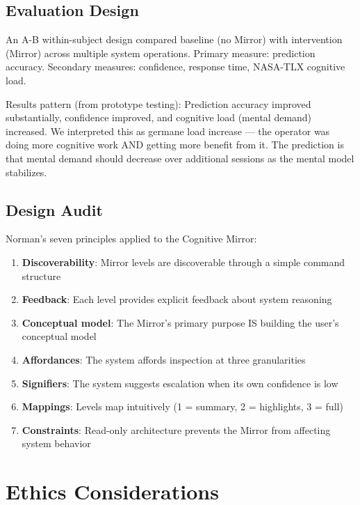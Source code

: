 \documentclass[11pt,a4paper]{article}
\begin{document}
\subsection{Evaluation Design}

An A-B within-subject design compared baseline (no Mirror) with intervention (Mirror) across multiple system operations. Primary measure: prediction accuracy. Secondary measures: confidence, response time, NASA-TLX cognitive load.

Results pattern (from prototype testing): Prediction accuracy improved substantially, confidence improved, and cognitive load (mental demand) increased. We interpreted this as germane load increase --- the operator was doing more cognitive work AND getting more benefit from it. The prediction is that mental demand should decrease over additional sessions as the mental model stabilizes.

\subsection{Design Audit}

Norman's seven principles applied to the Cognitive Mirror:
\begin{enumerate}[leftmargin=*, itemsep=2pt]
  \item \textbf{Discoverability}: Mirror levels are discoverable through a simple command structure
  \item \textbf{Feedback}: Each level provides explicit feedback about system reasoning
  \item \textbf{Conceptual model}: The Mirror's primary purpose IS building the user's conceptual model
  \item \textbf{Affordances}: The system affords inspection at three granularities
  \item \textbf{Signifiers}: The system suggests escalation when its own confidence is low
  \item \textbf{Mappings}: Levels map intuitively (1 = summary, 2 = highlights, 3 = full)
  \item \textbf{Constraints}: Read-only architecture prevents the Mirror from affecting system behavior
\end{enumerate}

\section{Ethics Considerations}
\end{document}
